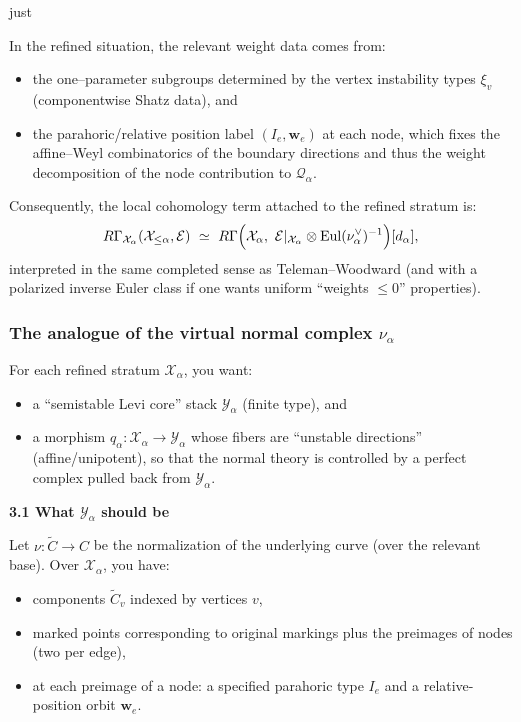 just \documentclass[12pt]{article}
\DeclareMathOperator{\Eul}{Eul}
\begin{document}
In the refined situation, the relevant weight data comes from:
\begin{itemize}
\item the one--parameter subgroups determined by the vertex instability types
$\xi_v$ (componentwise Shatz data), and
\item the parahoric/relative position label $(I_e,\mathbf w_e)$ at each node,
which fixes the affine--Weyl combinatorics of the boundary directions and thus
the weight decomposition of the node contribution to $\mathcal Q_\alpha$.
\end{itemize}

Consequently, the local cohomology term attached to the refined stratum is:
\[
R\Gamma_{\mathcal X_\alpha}(\mathcal X_{\le\alpha},\mathcal E)
\ \simeq\
R\Gamma\Bigl(\mathcal X_\alpha,\ 
\mathcal E|_{\mathcal X_\alpha}\otimes \Eul(\nu_\alpha^\vee)^{-1}
\Bigr)[d_\alpha],
\]
interpreted in the same completed sense as Teleman--Woodward (and with a polarized
inverse Euler class if one wants uniform ``weights $\le 0$'' properties).


\subsubsection*{The analogue of the virtual normal complex $\nu_\alpha$}

For each refined stratum $\mathcal X_\alpha$, you want:
\begin{itemize}
\item a ``semistable Levi core'' stack $\mathcal Y_\alpha$ (finite type), and
\item a morphism $q_\alpha:\mathcal X_\alpha\to \mathcal Y_\alpha$ whose fibers are ``unstable directions'' (affine/unipotent), so that the normal theory is controlled by a perfect complex pulled back from $\mathcal Y_\alpha$.
\end{itemize}

\medskip\noindent\textbf{3.1 What $\mathcal Y_\alpha$ should be}

Let $\nu:\widetilde C\to C$ be the normalization of the underlying curve (over the relevant base). Over $\mathcal X_\alpha$, you have:
\begin{itemize}
\item components $\widetilde C_v$ indexed by vertices $v$,
\item marked points corresponding to original markings plus the preimages of nodes (two per edge),
\item at each preimage of a node: a specified parahoric type $I_e$ and a relative-position orbit $\mathbf w_e$.
\end{itemize}
\end{document}
